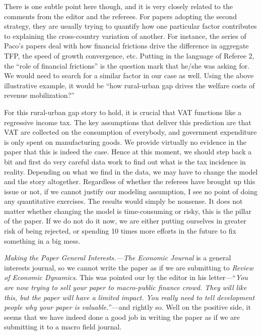 \documentclass[twoside,11pt,leqno]{article}
\newcommand{\rtext}[1]{{\red{#1}}}
\begin{document}
There is one subtle point here though, and it is very closely related to the comments from the editor and the referees. For papers adopting the second strategy, they are usually trying to quantify how one particular factor contributes to explaining the cross-country variation of another. For instance, the series of Paco's papers deal with how financial frictions drive the difference in aggregate TFP, the speed of growth convergence, etc. Putting in the language of Referee 2, the ``role of financial frictions'' is the question mark that he/she was asking for. We would need to search for a similar factor in our case as well. Using the above illustrative example, it would be ``how rural-urban gap drives the welfare costs of revenue mobilization?''

For this rural-urban gap story to hold, it is crucial that VAT functions like a regressive income tax. The key assumptions that deliver this prediction are that VAT are collected on the consumption of everybody, and government expenditure is only spent on manufacturing goods. We provide virtually no evidence in the paper that this is indeed the case. Hence at this moment, we should step back a bit and first do very careful data work to find out what is the tax incidence in reality. Depending on what we find in the data, we may have to change the model and the story altogether. \rtext{I will stand VERY FIRMLY on insisting this.} Regardless of whether the referees have brought up this issue or not, if we cannot justify our modeling assumption, I see no point of doing any quantitative exercises. The results would simply be nonsense. It does not matter whether changing the model is time-consuming or risky, this is the pillar of the paper. If we do not do it now, we are either putting ourselves in greater risk of being rejected, or spending 10 times more efforts in the future to fix something in a big mess.

\textit{Making the Paper General Interests.---}\textit{The Economic Journal} is a general interests journal, so we cannot write the paper as if we are submitting to \textit{Review of Economic Dynamics}. This was pointed our by the editor in his letter---``\textit{You are now trying to sell your paper to macro-public finance crowd. They will like this, but the paper will have a limited impact. You really need to tell development people why your paper is valuable.}''---and rightly so. Well on the positive side, it seems that we have indeed done a good job in writing the paper as if we are submitting it to a macro field journal.
\end{document}
